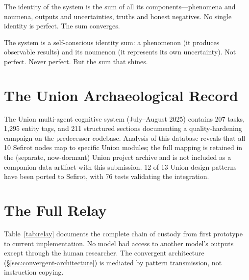 \documentclass[11pt]{article}
\theoremstyle{definition}
\theoremstyle{remark}
\begin{document}
The identity of the system is the sum of all its components---phenomena and
noumena, outputs and uncertainties, truths and honest negatives.  No single
identity is perfect.  The sum converges.

The system is a self-conscious identity sum: a phenomenon (it produces observable
results) and its noumenon (it represents its own uncertainty).  Not perfect.
Never perfect.  But the sum that shines.

\appendix

\section{The Union Archaeological Record}
\label{app:union}

The Union multi-agent cognitive system (July--August 2025) contains 207 tasks,
1,295 entity tags, and 211 structured sections documenting a quality-hardening
campaign on the predecessor codebase.  Analysis of this database reveals that
all 10 Sefirot nodes map to specific Union modules; the full mapping is
retained in the (separate, now-dormant) Union project archive and is not
included as a companion data artifact with this submission.
12 of 13 Union design patterns have been ported to Sefirot, with 76 tests
validating the integration.

\section{The Full Relay}
\label{app:relay}

Table~\ref{tab:relay} documents the complete chain of custody from first
prototype to current implementation.  No model had access to another model's
outputs except through the human researcher.  The convergent architecture
(\S\ref{sec:convergent-architecture}) is mediated by pattern transmission,
not instruction copying.
\end{document}
